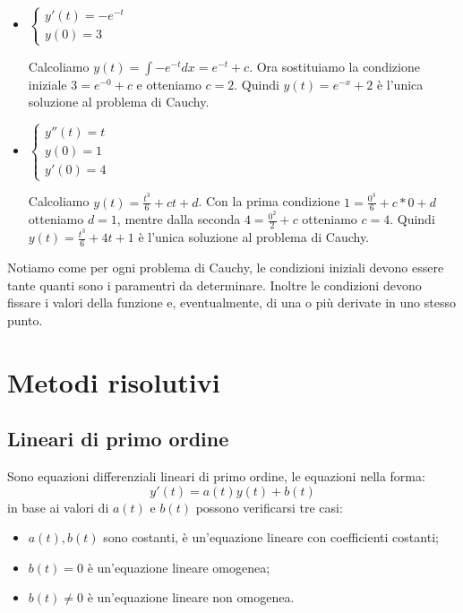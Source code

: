 \begin{example}\phantom{}
\begin{itemize}
    \item $\begin{cases}y'(t)=-e^{-t}\\y(0)=3\end{cases}$
    
        Calcoliamo $y(t)=\int -e^{-t}dx=e^{-t}+c$. Ora sostituiamo la condizione iniziale $3=e^{-0}+c$ e otteniamo $c=2$. Quindi $y(t)=e^{-x}+2$ è l'unica soluzione al problema di Cauchy.

    \item $\begin{cases}y''(t)=t\\y(0)=1\\y'(0)=4\end{cases}$
        
        Calcoliamo $y(t)=\frac{t^3}{6}+ct+d$. Con la prima condizione $1=\frac{0^3}{6}+c*0+d$ otteniamo $d=1$, mentre dalla seconda $4=\frac{0^2}{2}+c$ otteniamo $c=4$. Quindi $y(t)=\frac{t^3}{6}+4t+1$ è l'unica soluzione al problema di Cauchy.
\end{itemize}
\end{example}

\begin{osservation*}
    Notiamo come per ogni problema di Cauchy, le condizioni iniziali devono essere tante quanti sono i paramentri da determinare. Inoltre le condizioni devono fissare i valori della funzione e, eventualmente, di una o più derivate in uno stesso punto.
\end{osservation*}


\chapter{Metodi risolutivi}

\section{Lineari di primo ordine}
Sono equazioni differenziali lineari di primo ordine, le equazioni nella forma: \begin{equation*}y'(t)=a(t)y(t)+b(t)\end{equation*} in base ai valori di $a(t)$ e $b(t)$ possono verificarsi tre casi:
\begin{itemize}
    \item $a(t),b(t)$ sono costanti, è un'equazione lineare con coefficienti costanti;
    \item $b(t)=0$ è un'equazione lineare omogenea;
    \item $b(t)\neq0$ è un'equazione lineare non omogenea.
\end{itemize}

